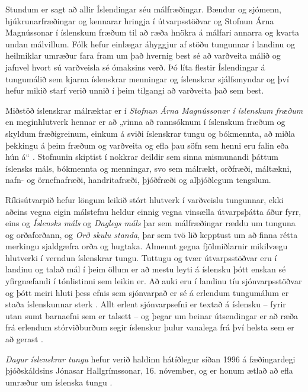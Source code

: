 \begin{multicols}{2}
Stundum er sagt að allir Íslendingar séu málfræðingar. Bændur og sjómenn, hjúkrunarfræðingar og kennarar hringja í útvarpsstöðvar og Stofnun Árna Magnússonar í íslenskum fræðum til að ræða hnökra á málfari annarra og kvarta undan málvillum. Fólk hefur einlægar áhyggjur af stöðu tungunnar í landinu og heilmiklar umræður fara fram um það hvernig best sé að varðveita málið og jafnvel hvort sú varðveisla sé ómaksins verð. 
Þó líta flestir Íslendingar á tungumálið sem kjarna íslenskrar menningar og íslenskrar sjálfsmyndar og því hefur mikið starf verið unnið í þeim tilgangi að varðveita það sem best.

Miðstöð íslenskrar málræktar er í \textit{Stofnun Árna Magnússonar í íslenskum fræðum} en meginhlutverk hennar er að „vinna að rannsóknum í íslenskum fræðum og skyldum fræðigreinum, einkum á sviði íslenskrar tungu og bókmennta, að miðla þekkingu á þeim fræðum og varðveita og efla þau söfn sem henni eru falin eða hún á“ \cite{alt2}. Stofnunin skiptist í nokkrar deildir sem sinna mismunandi þáttum íslensks máls, bókmennta og menningar, svo sem málrækt, orðfræði, máltækni, nafn- og örnefnafræði, handritafræði, þjóðfræði og alþjóðlegum tengslum.
    
Ríkisútvarpið hefur löngum leikið stórt hlutverk í varðveislu tungunnar, ekki aðeins vegna eigin málstefnu heldur einnig vegna vinsælla útvarpsþátta áður fyrr, eins og \textit{Íslensks máls} og \textit{Daglegs máls} þar sem málfræðingar ræddu um tunguna og orðaforðann, og \textit{Orð skulu standa}, þar sem tvö lið kepptust um að finna rétta merkingu sjaldgæfra orða og hugtaka. Almennt gegna fjölmiðlarnir mikilvægu hlutverki í verndun íslenskrar tungu.
Tuttugu og tvær útvarpsstöðvar eru í landinu og talað mál í þeim öllum er að mestu leyti á íslensku þótt enskan sé yfirgnæfandi í tónlistinni sem leikin er. Að auki eru í landinu tíu sjónvarpsstöðvar og þótt meiri hluti þess efnis sem sjónvarpað er sé á erlendum tungumálum er staða íslenskunnar sterk \cite{hag2}. Allt erlent sjónvarpsefni er textað á íslensku -- fyrir utan sumt barnaefni sem er talsett -- og þegar um beinar útsendingar er að ræða frá erlendum stórviðburðum segir íslenskur þulur vanalega frá því helsta sem er að gerast \cite{alt3}.

\textit{Dagur íslenskrar tungu} hefur verið haldinn hátíðlegur síðan 1996 á fæðingardegi þjóðskáldsins Jónasar Hallgrímssonar, 16. nóvember, og er honum ætlað að efla umræður um íslenska tungu \cite{men1}.


\end{multicols}
